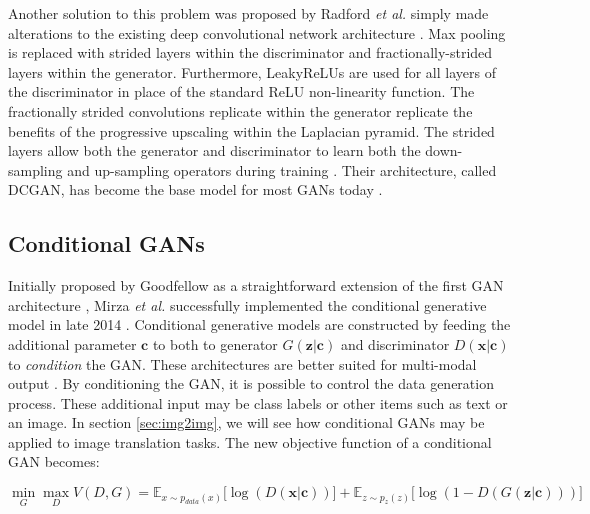 \documentclass[11pt]{article}
\begin{document}
Another solution to this problem was proposed by Radford \textit{et al.}  simply made alterations to the existing deep convolutional network architecture \citep{2015arXiv151106434R}. Max pooling is replaced with strided layers within the discriminator and fractionally-strided layers within the generator. Furthermore, LeakyReLUs are used for all layers of the discriminator in place of the standard ReLU non-linearity function. The fractionally strided convolutions replicate within the generator replicate the benefits of the progressive upscaling within the Laplacian pyramid. The strided layers allow both the generator and discriminator to learn both the down-sampling and up-sampling operators during training \citep{2017arXiv171007035C}. Their architecture, called DCGAN, has become the base model for most GANs today \citep{2017arXiv170100160G}.

\subsection{Conditional GANs}
Initially proposed by Goodfellow as a straightforward extension of the first GAN architecture \citep{2014arXiv1406.2661G}, Mirza \textit{et al.} successfully implemented the conditional generative model in late 2014 \citep{2014arXiv1411.1784M}. Conditional generative models are constructed by feeding the additional parameter $\bm{c}$ to both to generator $G(\bm{z}|\bm{c})$ and discriminator $D(\bm{x}|\bm{c})$ to \textit{condition} the GAN. These architectures are better suited for multi-modal output \citep{2017arXiv171007035C}. By conditioning the GAN, it is possible to control the data generation process. These additional input may be class labels or other items such as text or an image. In section \ref{sec:img2img}, we will see how conditional GANs may be applied to image translation tasks. The new objective function of a conditional GAN becomes:

$$\min_{G}\max_{D}V(D, G) = \mathbb{E}_{x\sim p_{data}(x)}\Big[\log(D(\bm{x}|\bm{c}))\Big] + \mathbb{E}_{z\sim p_z(z)}\Big[\log(1-D(G(\bm{z}|\bm{c})))\Big]$$
\end{document}
